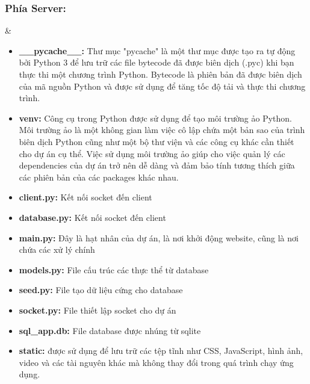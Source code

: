 \documentclass[a4paper]{article}
\begin{document}
\subsubsection{Phía Server:}
    \begin{picture}
   \end{picture}&
\begin{itemize}
    \item    \textbf{\_\_pycache\_\_:}
    Thư mục "pycache" là một thư mục được tạo ra tự động bởi Python 3 để lưu trữ các file bytecode đã được biên dịch (.pyc) khi bạn thực thi một chương trình Python. Bytecode là phiên bản đã được biên dịch của mã nguồn Python và được sử dụng để tăng tốc độ tải và thực thi chương trình.
        \item    \textbf{venv:}
   Công cụ trong Python được sử dụng để tạo môi trường ảo Python. Môi trường ảo là một không gian làm việc cô lập chứa một bản sao của trình biên dịch Python cũng như một bộ thư viện và các công cụ khác cần thiết cho dự án cụ thể. Việc sử dụng môi trường ảo giúp cho việc quản lý các dependencies của dự án trở nên dễ dàng và đảm bảo tính tương thích giữa các phiên bản của các packages khác nhau.
   \item    \textbf{client.py:}
   Kết nối socket đến client
   \item    \textbf{database.py:}
   Kết nối socket đến client 
   \item \textbf{main.py:}
   Đây là hạt nhân của dự án, là nơi khởi động website, cũng là nơi chứa các xử lý chính
   \item \textbf{models.py:}
   File cấu trúc các thực thể từ database
   \item \textbf{seed.py:}
   File tạo dữ liệu cứng cho database
   \item \textbf{socket.py:}
   File thiết lập socket cho dự án
   \item \textbf{sql\_app.db:}
File database được nhúng từ sqlite
   \item \textbf{static:}
   được sử dụng để lưu trữ các tệp tĩnh như CSS, JavaScript, hình ảnh, video và các tài nguyên khác mà không thay đổi trong quá trình chạy ứng dụng.
\end{itemize}
\end{document}
